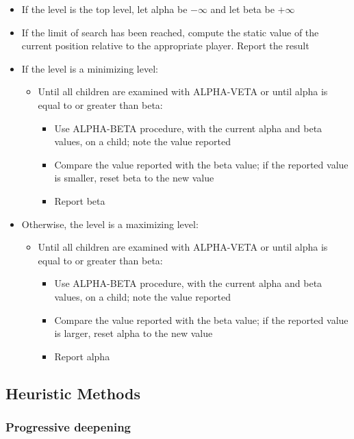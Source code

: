 \documentclass{article}
\begin{document}
\begin{itemize}
  \item If the level is the top level, let alpha be
    \(-\infty\) and let beta be \(+\infty\)
  \item If the limit of search has been reached, compute the
    static value of the current position relative to the
    appropriate player. Report the result
  \item If the level is a minimizing level:
    \begin{itemize}
      \item Until all children are examined with ALPHA-VETA or
        until alpha is equal to or greater than beta:
        \begin{itemize}
          \item Use ALPHA-BETA procedure, with the current alpha
            and beta values, on a child; note the value reported
          \item Compare the value reported with the beta value;
            if the reported value is smaller, reset beta to the
            new value
          \item Report beta
        \end{itemize}
    \end{itemize}
      \item Otherwise, the level is a maximizing level:
    \begin{itemize}
      \item Until all children are examined with ALPHA-VETA or
        until alpha is equal to or greater than beta:
        \begin{itemize}
          \item Use ALPHA-BETA procedure, with the current alpha
            and beta values, on a child; note the value reported
          \item Compare the value reported with the beta value;
            if the reported value is larger, reset alpha to the
            new value
          \item Report alpha
        \end{itemize}
    \end{itemize}
\end{itemize}

\subsection{Heuristic Methods}

\subsubsection{Progressive deepening}
\end{document}

